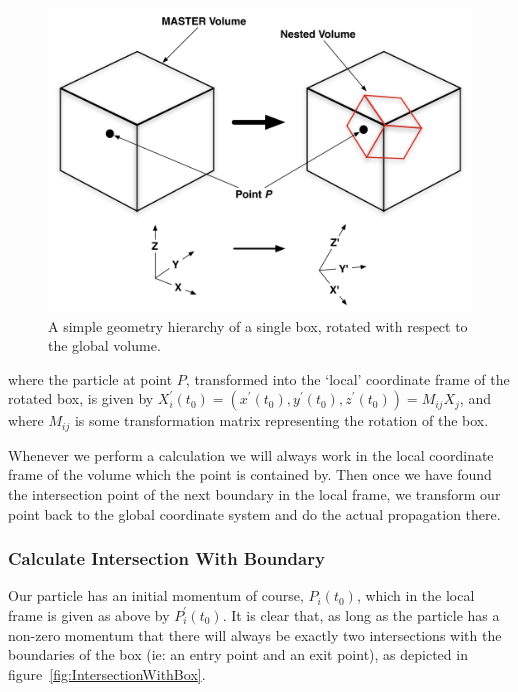 \documentclass[11pt,a4paper,oneside]{article}
\begin{document}
\begin{figure}[!htbp] 	
\begin{center}
\includegraphics[scale=0.4]{designdocumentimages/fig1-NestedBox}
\end{center}
\caption{A simple geometry hierarchy of a single box, rotated with respect to the global volume.}
\label{fig:NestedBox}
\end{figure}

where the particle at point $P$, transformed into the `local' coordinate frame of the rotated box, is given by $X^{\prime}_{i}(t_{0}) = (x^{\prime}(t_{0}), y^{\prime}(t_{0}), z^{\prime}(t_{0})) = M_{ij}X_{j}$, and where $M_{ij}$ is some transformation matrix representing the rotation of the box. 

Whenever we perform a calculation we will always work in the local coordinate frame of the volume which the point is contained by. Then once we have found the intersection point of the next boundary in the local frame, we transform our point back to the global coordinate system and do the actual propagation there. 

\subsubsection*{Calculate Intersection With Boundary}

Our particle has an initial momentum of course, $P_{i}(t_{0})$, which in the local frame is given as above by $P^{\prime}_{i}(t_{0})$. It is clear that, as long as the particle has a non-zero momentum that there will always be exactly two intersections with the boundaries of the box (ie: an entry point and an exit point), as depicted in figure~\ref{fig:IntersectionWithBox}.
\end{document}
